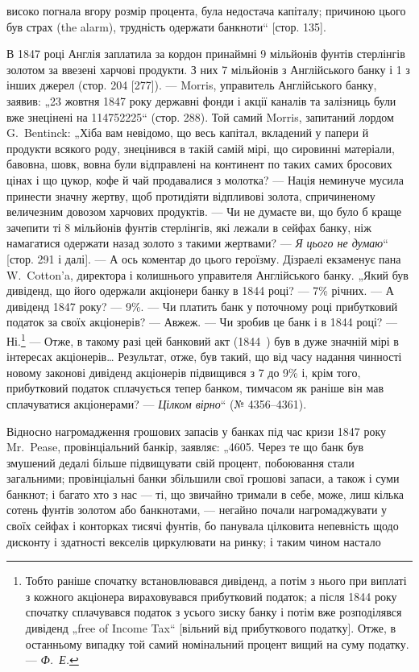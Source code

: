 \parcont{}  %
високо погнала вгору розмір процента, була недостача капіталу;
причиною цього був страх (the alarm), трудність одержати банкноти“ [стор. 135].

В 1847 році Англія заплатила за кордон принаймні 9 мільйонів фунтів стерлінгів золотом за ввезені
харчові продукти.
З них 7 мільйонів з Англійського банку і 1 з інших джерел
(стор. 204 [277]). — Morris, управитель Англійського банку, заявив:
„23 жовтня 1847 року державні фонди і акції каналів та залізниць
були вже знецінені на \num{114752225}“ (стор. 288).
Той самий Morris, запитаний лордом G.~Bentinck: „Хіба вам невідомо, що весь капітал, вкладений у
папери й продукти всякого роду, знецінився в такій самій мірі, що сировинні матеріали,
бавовна, шовк, вовна були відправлені на континент по таких самих
бросових цінах і що цукор, кофе й чай продавалися з молотка? —
Нація неминуче мусила принести значну жертву, щоб протидіяти
відпливові золота, спричиненому величезним довозом харчових
продуктів. — Чи не думаєте ви, що було б краще зачепити ті
8 мільйонів фунтів стерлінгів, які лежали в сейфах банку, ніж
намагатися одержати назад золото з такими жертвами? — \emph{Я цього
не думаю}“ [стор. 291 і далі]. — А ось коментар до цього героїзму. Дізраелі екзаменує пана W.~Cotton’a, директора і колишнього
управителя Англійського банку. „Який був дивіденд, що його
одержали акціонери банку в 1844 році? — 7\% річних. — А дивіденд 1847 року? — 9\%. — Чи платить банк у
поточному році прибутковий податок за своїх акціонерів? — Авжеж. — Чи зробив
це банк і в 1844 році? — Ні.\footnote{
Тобто раніше спочатку встановлювався дивіденд, а потім з нього при
виплаті з кожного акціонера вираховувався прибутковий податок; а після
1844 року спочатку сплачувався податок з усього зиску банку і потім вже
розподілявся дивіденд „free of Income Tax“ [вільний від прибуткового податку].
Отже, в останньому випадку той самий номінальний процент вищий на суму
податку. — \emph{Ф.~Е.}
} — Отже, в такому разі цей банковий
акт (1844~) був в дуже значній мірі в інтересах акціонерів\dots{}
Результат, отже, був такий, що від часу надання чинності новому законові дивіденд акціонерів
підвищився з 7 до 9\% і,
крім того, прибутковий податок сплачується тепер банком, тимчасом як раніше він мав сплачуватися
акціонерами? — \emph{Цілком
вірно}“ (№ 4356--4361).

Відносно нагромадження грошових запасів у банках під час
кризи 1847 року Mr.~Pease, провінціальний банкір, заявляє: „4605.
Через те що банк був змушений дедалі більше підвищувати
свій процент, побоювання стали загальними; провінціальні банки
збільшили свої грошові запаси, а також і суми банкнот; і багато хто з нас — ті, що звичайно тримали
в себе, може, лиш
кілька сотень фунтів золотом або банкнотами, — негайно почали нагромаджувати у своїх сейфах і
конторках тисячі фунтів, бо панувала цілковита непевність щодо дисконту і здатності векселів
циркулювати на ринку; і таким чином настало
\parbreak{}  %
